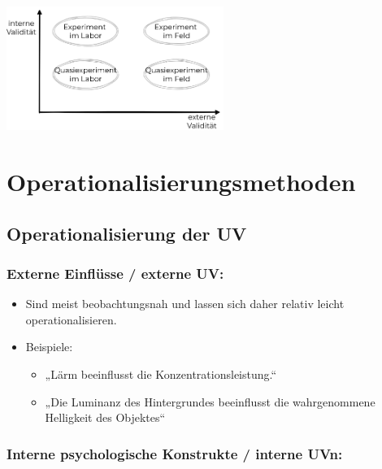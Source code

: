 \documentclass[
]{book}
\providecommand{\tightlist}{%
  \setlength{\itemsep}{0pt}\setlength{\parskip}{0pt}}
\begin{document}
\begin{center}\includegraphics[width=200pt]{imgs/validitaeten} \end{center}

\hypertarget{operationalisierungsmethoden}{%
\section{Operationalisierungsmethoden}\label{operationalisierungsmethoden}}

\hypertarget{operationalisierung-der-uv}{%
\subsection{Operationalisierung der UV}\label{operationalisierung-der-uv}}

\hypertarget{externe-einfluxfcsse-externe-uv}{%
\subsubsection{Externe Einflüsse / externe UV:}\label{externe-einfluxfcsse-externe-uv}}

\begin{itemize}
\tightlist
\item
  Sind meist beobachtungsnah und lassen sich daher relativ leicht operationalisieren.
\item
  Beispiele:

  \begin{itemize}
  \tightlist
  \item
    „Lärm beeinflusst die Konzentrationsleistung.``
  \item
    „Die Luminanz des Hintergrundes beeinflusst die wahrgenommene Helligkeit des Objektes``
  \end{itemize}
\end{itemize}

\hypertarget{interne-psychologische-konstrukte-interne-uvn}{%
\subsubsection{Interne psychologische Konstrukte / interne UVn:}\label{interne-psychologische-konstrukte-interne-uvn}}
\end{document}
